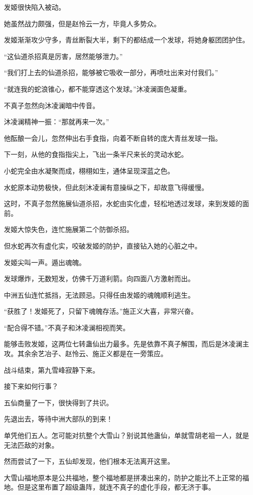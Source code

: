 \begin{this_body}
发姬很快陷入被动。

她虽然战力颇强，但是赵怜云一方，毕竟人多势众。

发姬渐渐攻少守多，青丝断裂大半，剩下的都结成一个发球，将她身躯团团护住。

“这仙道杀招真是厉害，居然能够泄力。”

“我们打上去的仙道杀招，能够被它吸收一部分，再喷吐出来对付我们。”

“就连我的蛇浪锥心，都不能穿透这个发球。”沐凌澜面色凝重。

不真子忽然向沐凌澜暗中传音。

沐凌澜精神一振：“那就再来一次。”

他酝酿一会儿，忽然伸出右手食指，向着不断自转的庞大青丝发球一指。

下一刻，从他的食指指尖上，飞出一条半尺来长的灵动水蛇。

小蛇完全由水凝聚而成，栩栩如生，通体呈现深蓝之色。

水蛇原本动势极快，但此刻沐凌澜有意操纵之下，却故意飞得缓慢。

这时，不真子忽然施展仙道杀招，水蛇由实化虚，轻松地透过发球，来到发姬的面前。

发姬大惊失色，连忙施展第二个防御杀招。

但水蛇再次有虚化实，咬破发姬的防护，直接钻入她的心脏之中。

发姬尖叫一声。遁出魂魄。

发球爆炸，无数短发，仿佛千万道利箭。向四面八方激射而出。

中洲五仙连忙抵挡，无法顾忌。只得任由发姬的魂魄顺利逃生。

“获胜了！发姬死了，只留下魂魄存活。”施正义大喜，非常兴奋。

“配合得不错。”不真子和沐凌澜相视而笑。

能够击败发姬，这两位七转蛊仙出力最多。先是依靠不真子解围，而后是沐凌澜主攻。其余余艺冶子、赵怜云、施正义都是在一旁策应。

战斗结束，第九雪峰寂静下来。

接下来如何行事？

五仙商量了一下，很快得到了共识。

先退出去，等待中洲大部队的到来！

单凭他们五人。怎可能对抗整个大雪山？别说其他蛊仙，单就雪胡老祖一人，就是无法匹敌的对象。

然而尝试了一下，五仙却发现，他们根本无法离开这里。

大雪山福地原本是公共福地，整个福地都是拼凑出来的，防护之能比不上正常的福地。但是这里布置了超级蛊阵，就连不真子的虚化手段，都无济于事。


\end{this_body}
